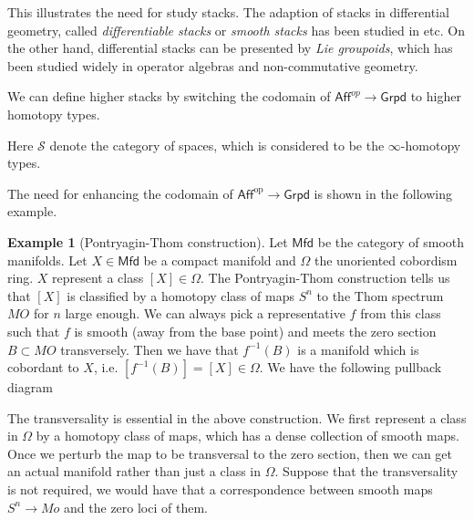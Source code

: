 \documentclass[12pt]{amsart}
\theoremstyle{definition}
\newtheorem{example}[thm]{Example}
\theoremstyle{remark}
\numberwithin{equation}{section}
\newcommand{\1}{{\mathbb{1}}}
\newcommand{\op}{\operatorname{op}}
\newcommand{\mfd}{\mathsf{Mfd}}
\newcommand{\gpd}{\mathsf{Grpd}}
\newcommand{\aff}{\mathsf{Aff}}\newcommand{\alg}{\mathsf{Alg}}
\newcommand{\Sp}{{\mathcal{S}}}
\newcommand{\igpd}{\mathsf{Grpd_{\infty}}}
\begin{document}
This illustrates the need for study stacks. The adaption of stacks in differential geometry, called {\it differentiable stacks} or {\it smooth stacks} has been studied in \cite{Met03}\cite{BX06}\cite{Car11} etc. On the other hand, differential stacks can be presented by {\it Lie groupoids}, which has been studied widely in operator algebras and non-commutative geometry.

We can define higher stacks by switching the codomain of $\aff^{op} \to \gpd$ to higher homotopy types. 
\begin{center}
\end{center}

Here $\mathcal{S}$ denote the category of spaces, which is considered to be the $\infty$-homotopy types.

The need for  enhancing the codomain of $\aff^{\op} \to \gpd$ is shown in the following example.



\begin{example}[Pontryagin-Thom construction] 
Let $\mfd$ be the category of smooth manifolds. 	Let $X\in \mfd$ be a compact manifold and $\Omega$ the unoriented cobordism ring. $X$ represent a class $[X] \in \Omega$. The Pontryagin-Thom construction tells us that $[X]$ is classified by a homotopy class of maps $S^n$ to the Thom spectrum $MO$ for $n$ large enough. We can always pick a representative $f$ from this class such that $f$ is smooth (away from the base point) and meets the zero section $B\subset MO$ transversely. Then we have that $f^{-1}(B)$ is a manifold which is cobordant to $X$, i.e. $[f^{-1}(B)]=[X] \in \Omega$. We have the following pullback diagram
		\begin{center}
	\end{center}
\end{example}
The transversality is essential in the above construction. We first represent a class in $\Omega$ by a homotopy class of maps, which has a dense collection of smooth maps. Once we perturb the map to be transversal to the zero section, then we can get an actual manifold rather than just a class in $\Omega$. Suppose that the transversality is not required, we would have that a correspondence between smooth maps $S^n\to Mo$ and the zero loci of them.
\end{document}
